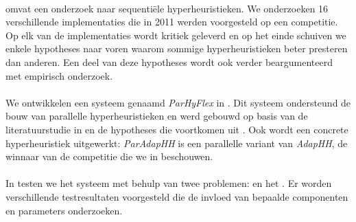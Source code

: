 \paragraph{}
 omvat een onderzoek naar sequenti\"ele hyperheuristieken. We onderzoeken 16 verschillende implementaties die in 2011 werden voorgesteld op een competitie. Op elk van de implementaties wordt kritiek geleverd en op het einde schuiven we enkele hypotheses naar voren waarom sommige hyperheuristieken beter presteren dan anderen. Een deel van deze hypotheses wordt ook verder beargumenteerd met empirisch onderzoek.

\paragraph{}
We ontwikkelen een systeem genaamd \emph{ParHyFlex} in . Dit systeem ondersteund de bouw van parallelle hyperheuristieken en werd gebouwd op basis van de literatuurstudie in  en de hypotheses die voortkomen uit . Ook wordt een concrete hyperheuristiek uitgewerkt: \emph{ParAdapHH} is een parallelle variant van \emph{AdapHH}, de winnaar van de competitie die we in  beschouwen.

\paragraph{}
In  testen we het systeem met behulp van twee problemen:  en het . Er worden verschillende testresultaten voorgesteld die de invloed van bepaalde componenten en parameters onderzoeken.



